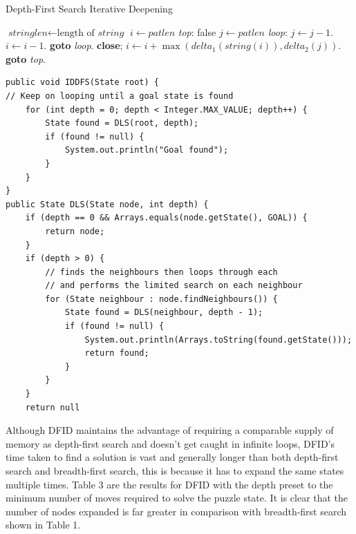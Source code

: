 \documentclass[final]{cmpreport}
\begin{document}
\begin{algorithm}
	\caption{Depth-First Search Iterative Deepening}\label{euclid}
	\begin{algorithmic}[1]
		\State $\textit{stringlen} \gets \text{length of }\textit{string}$
		\State $i \gets \textit{patlen}$
		\BState \emph{top}:
		 \Return false
		\EndIf
		\State $j \gets \textit{patlen}$
		\BState \emph{loop}:
		\State $j \gets j-1$.
		\State $i \gets i-1$.
		\State \textbf{goto} \emph{loop}.
		\State \textbf{close};
		\EndIf
		\State $i \gets i+\max(\textit{delta}_1(\textit{string}(i)),\textit{delta}_2(j))$.
		\State \textbf{goto} \emph{top}.
		\EndProcedure
	\end{algorithmic}
\end{algorithm}



\begin{verbatim}	
public void IDDFS(State root) {
// Keep on looping until a goal state is found
    for (int depth = 0; depth < Integer.MAX_VALUE; depth++) {
        State found = DLS(root, depth);
        if (found != null) {
            System.out.println("Goal found");
        }
    }
}
public State DLS(State node, int depth) {
    if (depth == 0 && Arrays.equals(node.getState(), GOAL)) {
        return node;
    }
    if (depth > 0) {
        // finds the neighbours then loops through each
        // and performs the limited search on each neighbour
        for (State neighbour : node.findNeighbours()) {
            State found = DLS(neighbour, depth - 1);
            if (found != null) {
                System.out.println(Arrays.toString(found.getState()));
                return found;
            }
        }
    }
    return null
\end{verbatim}

Although DFID maintains the advantage of requiring a comparable supply of memory as depth-first search and doesn't get caught in infinite loops, DFID's time taken to find a solution is vast and generally longer than both depth-first search and breadth-first search, this is because it has to expand the same states multiple times. Table 3 are the results for DFID with the depth preset to the minimum number of moves required to solve the puzzle state. It is clear that the number of nodes expanded is far greater in comparison with breadth-first search shown in Table 1.
\end{document}
